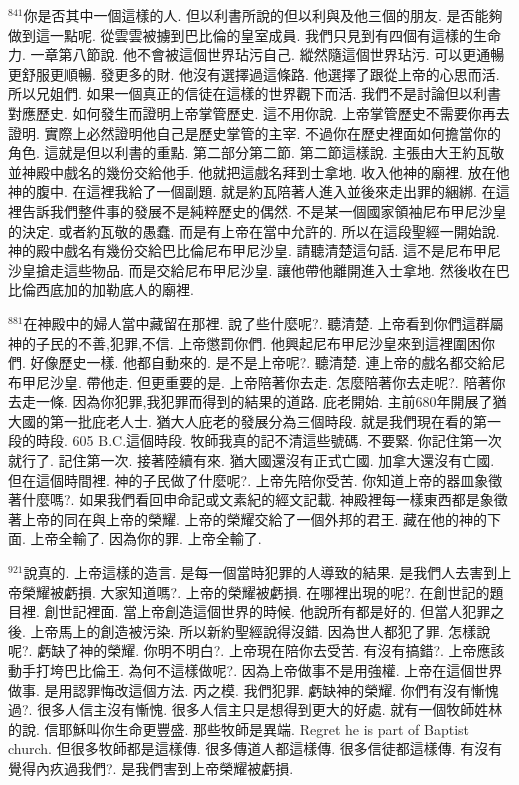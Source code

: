 \documentclass{book}
\begin{document}
$^{841}$你是否其中一個這樣的人.
但以利書所說的但以利與及他三個的朋友.
是否能夠做到這一點呢.
從雲雲被擄到巴比倫的皇室成員.
我們只見到有四個有這樣的生命力.
一章第八節說.
他不會被這個世界玷污自己.
縱然隨這個世界玷污.
可以更通暢更舒服更順暢.
發更多的財.
他沒有選擇過這條路.
他選擇了跟從上帝的心思而活.
所以兄姐們.
如果一個真正的信徒在這樣的世界觀下而活.
我們不是討論但以利書對應歷史.
如何發生而證明上帝掌管歷史.
這不用你說.
上帝掌管歷史不需要你再去證明.
實際上必然證明他自己是歷史掌管的主宰.
不過你在歷史裡面如何擔當你的角色.
這就是但以利書的重點.
第二部分第二節.
第二節這樣說.
主張由大王約瓦敬並神殿中戲名的幾份交給他手.
他就把這戲名拜到士拿地.
收入他神的廟裡.
放在他神的腹中.
在這裡我給了一個副題.
就是約瓦陪著人進入並後來走出罪的綑綁.
在這裡告訴我們整件事的發展不是純粹歷史的偶然.
不是某一個國家領袖尼布甲尼沙皇的決定.
或者約瓦敬的愚蠢.
而是有上帝在當中允許的.
所以在這段聖經一開始說.
神的殿中戲名有幾份交給巴比倫尼布甲尼沙皇.
請聽清楚這句話.
這不是尼布甲尼沙皇搶走這些物品.
而是交給尼布甲尼沙皇.
讓他帶他離開進入士拿地.
然後收在巴比倫西底加的加勒底人的廟裡.

$^{881}$在神殿中的婦人當中藏留在那裡.
說了些什麼呢?.
聽清楚.
上帝看到你們這群屬神的子民的不善,犯罪,不信.
上帝懲罰你們.
他興起尼布甲尼沙皇來到這裡圍困你們.
好像歷史一樣.
他都自動來的.
是不是上帝呢?.
聽清楚.
連上帝的戲名都交給尼布甲尼沙皇.
帶他走.
但更重要的是.
上帝陪著你去走.
怎麼陪著你去走呢?.
陪著你去走一條.
因為你犯罪,我犯罪而得到的結果的道路.
庇老開始.
主前680年開展了猶大國的第一批庇老人士.
猶大人庇老的發展分為三個時段.
就是我們現在看的第一段的時段.
605 B.C.這個時段.
牧師我真的記不清這些號碼.
不要緊.
你記住第一次就行了.
記住第一次.
接著陸續有來.
猶大國還沒有正式亡國.
加拿大還沒有亡國.
但在這個時間裡.
神的子民做了什麼呢?.
上帝先陪你受苦.
你知道上帝的器皿象徵著什麼嗎?.
如果我們看回申命記或文素紀的經文記載.
神殿裡每一樣東西都是象徵著上帝的同在與上帝的榮耀.
上帝的榮耀交給了一個外邦的君王.
藏在他的神的下面.
上帝全輸了.
因為你的罪.
上帝全輸了.

$^{921}$說真的.
上帝這樣的造言.
是每一個當時犯罪的人導致的結果.
是我們人去害到上帝榮耀被虧損.
大家知道嗎?.
上帝的榮耀被虧損.
在哪裡出現的呢?.
在創世記的題目裡.
創世記裡面.
當上帝創造這個世界的時候.
他說所有都是好的.
但當人犯罪之後.
上帝馬上的創造被污染.
所以新約聖經說得沒錯.
因為世人都犯了罪.
怎樣說呢?.
虧缺了神的榮耀.
你明不明白?.
上帝現在陪你去受苦.
有沒有搞錯?.
上帝應該動手打垮巴比倫王.
為何不這樣做呢?.
因為上帝做事不是用強權.
上帝在這個世界做事.
是用認罪悔改這個方法.
丙之模.
我們犯罪.
虧缺神的榮耀.
你們有沒有慚愧過?.
很多人信主沒有慚愧.
很多人信主只是想得到更大的好處.
就有一個牧師姓林的說.
信耶穌叫你生命更豐盛.
那些牧師是異端.
Regret he is part of Baptist church.
但很多牧師都是這樣傳.
很多傳道人都這樣傳.
很多信徒都這樣傳.
有沒有覺得內疚過我們?.
是我們害到上帝榮耀被虧損.
\end{document}
